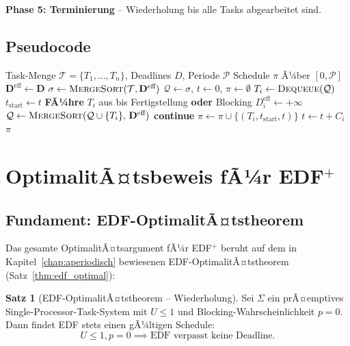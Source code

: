 ﻿\documentclass[a4paper,12pt]{report}
\theoremstyle{definition}
\newtheorem{satz}{Satz}[chapter]
\begin{document}
\textbf{Phase 5: Terminierung} -- Wiederholung bis alle Tasks abgearbeitet sind.

\subsection{Pseudocode}

\begin{algorithm}[H]
	\caption{EDF$^+$ Scheduling Algorithm}
	\begin{algorithmic}[1]
		\Require Task-Menge $\mathcal{T}=\{T_1,\ldots,T_n\}$, Deadlines $D$, Periode $\mathcal{P}$
		\Ensure Schedule $\pi$ Ã¼ber $[0,\mathcal{P}]$
		\State $\mathbf{D}^{\text{eff}} \leftarrow \mathbf{D}$
		\State $\sigma \leftarrow \textsc{MergeSort}(\mathcal{T}, \mathbf{D}^{\text{eff}})$
		\State $\mathcal{Q} \leftarrow \sigma$, $t \leftarrow 0$, $\pi \leftarrow \emptyset$
		\State $T_i \leftarrow \textsc{Dequeue}(\mathcal{Q})$
		\State $t_{\text{start}} \leftarrow t$
		\State \textbf{FÃ¼hre} $T_i$ aus bis Fertigstellung \textbf{oder} Blocking
		\State $D_i^{\text{eff}} \leftarrow +\infty$
		\State $\mathcal{Q} \leftarrow \textsc{MergeSort}(\mathcal{Q} \cup \{T_i\},\, \mathbf{D}^{\text{eff}})$
		\State \textbf{continue}
		\EndIf
		\State $\pi \leftarrow \pi \cup \{(T_i, t_{\text{start}}, t)\}$
		\State $t \leftarrow t + C_i$
		\EndWhile
		\State \Return $\pi$
	\end{algorithmic}
\end{algorithm}

\section{OptimalitÃ¤tsbeweis fÃ¼r EDF$^+$}

\subsection{Fundament: EDF-OptimalitÃ¤tstheorem}

Das gesamte OptimalitÃ¤tsargument fÃ¼r EDF$^+$ beruht auf dem in Kapitel~\ref{chap:aperiodisch}
bewiesenen EDF-OptimalitÃ¤tstheorem (Satz~\ref{thm:edf_optimal}):

\begin{satz}[EDF-OptimalitÃ¤tstheorem -- Wiederholung]
	\label{satz:edf_opt_wieder}
	Sei $\Sigma$ ein prÃ¤emptives Single-Processor-Task-System mit $U \leq 1$ und
	Blocking-Wahrscheinlichkeit $p = 0$. Dann findet EDF stets einen gÃ¼ltigen Schedule:
	\[
		U \leq 1, p = 0 \implies \text{EDF verpasst keine Deadline.}
	\]
\end{satz}
\end{document}
